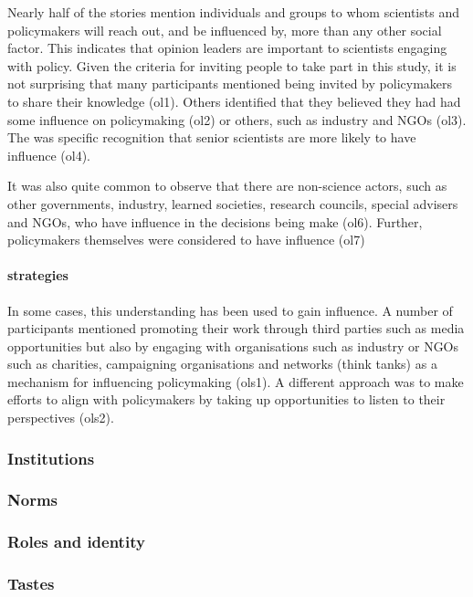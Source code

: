 Nearly half of the stories mention individuals and groups to whom scientists and policymakers will reach out, and be influenced by, more than any other social factor. This indicates that opinion leaders are important to scientists engaging with policy. Given the criteria for inviting people to take part in this study, it is not surprising that many participants mentioned being invited by policymakers to share their knowledge (ol1). Others identified that they believed they had had some influence on policymaking (ol2) or others, such as industry and NGOs (ol3). The was specific recognition that senior scientists are more likely to have influence (ol4).  

It was also quite common to observe that there are non-science actors, such as other governments, industry, learned societies, research councils, special advisers and NGOs, who have influence in the decisions being make (ol6). Further, policymakers themselves were considered to have influence (ol7)

\paragraph{strategies}

In some cases, this understanding has been used to gain influence. A number of participants mentioned promoting their work through third parties such as media opportunities but also by engaging with organisations such as industry or NGOs such as charities, campaigning organisations and networks (think tanks) as a mechanism for influencing policymaking (ols1). A different approach was to make efforts to align with policymakers by taking up opportunities to listen to their perspectives (ols2).

\subsubsection{Institutions}\label{sec:resinstitutions}
\subsubsection{Norms}\label{sec:resnorms}
\subsubsection{Roles and identity}\label{sec:resroles}
\subsubsection{Tastes}\label{sec:restastes}

